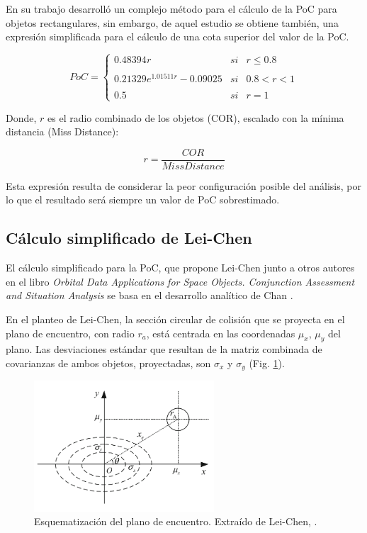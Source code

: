 En su trabajo \citep{alfano2008method} desarroll\'o un complejo m\'etodo para el c\'alculo de la PoC para objetos rectangulares, sin embargo, de aquel estudio se obtiene tambi\'en, una expresi\'on simplificada para el c\'alculo de una cota superior del valor de la PoC. 

$$
PoC= \left\{ \begin{array}{lcc}
             0.48394 r &   si  & r \leq 0.8 \\
             \\ 0.21329 e^{1.01511 r}-0.09025 &  si & 0.8 < r < 1 \\
             \\ 0.5 &  si  & r = 1
             \end{array}
   \right.
$$

Donde, $r$ es el radio combinado de los objetos (COR), escalado con la m\'inima distancia (Miss Distance): 

$$
 r = \frac{COR}{Miss Distance}
$$

Esta expresi\'on resulta de considerar la peor configuraci\'on  posible del an\'alisis, por lo que el resultado ser\'a siempre un valor de PoC sobrestimado. 



\subsection{C\'alculo simplificado de Lei-Chen}\label{subsec:pocsimp}

El c\'alculo simplificado para la PoC, que propone Lei-Chen junto a otros autores en el libro 
{\it{Orbital Data Applications for Space Objects. Conjunction Assessment and Situation Analysis}} \citep{leichen} se basa en el desarrollo anal\'itico de Chan \citep{chan2003improved}.

En el planteo de Lei-Chen, la secci\'on circular de colisi\'on que se proyecta en el plano de encuentro, con radio $r_{a}$, est\'a centrada en las coordenadas $\mu_{x}$, $\mu_{y}$ del plano. Las desviaciones est\'andar que resultan de la matriz combinada de covarianzas de ambos objetos, proyectadas, son $\sigma_{x}$ y $\sigma_{y}$  (Fig. \ref{fig:planoenc}).\\

\begin{figure}[!h]
\centering
\includegraphics[width=0.6\textwidth]{imagenes/planodeencuentro}
\caption[Plano de Encuentro]{Esquematizaci\'on del plano de encuentro. Extra\'ido de Lei-Chen, \citep{leichen}.}
\label{fig:planoenc}
\end{figure}

